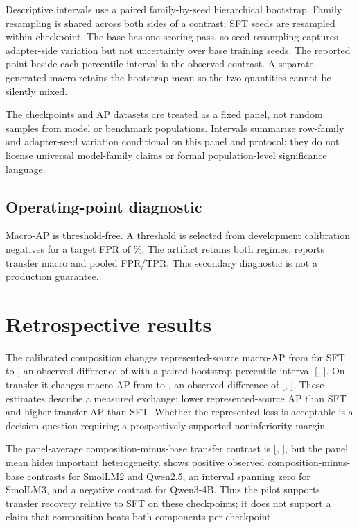 \documentclass[11pt]{article}
\begin{document}
Descriptive intervals use a paired family-by-seed hierarchical bootstrap.  Family resampling is
shared across both sides of a contrast; SFT seeds are resampled within checkpoint.  The base has
one scoring pass, so seed resampling captures adapter-side variation but not uncertainty over base
training seeds.  The reported point beside each percentile interval is the observed contrast.  A
separate generated macro retains the bootstrap mean so the two quantities cannot be silently
mixed.

The \PilotNModels{} checkpoints and \PilotNAPDatasets{} AP datasets are treated as a fixed panel, not random samples from
model or benchmark populations.  Intervals summarize row-family and adapter-seed variation
conditional on this panel and protocol; they do not license universal model-family claims or
formal population-level significance language.

\subsection{Operating-point diagnostic}

Macro-AP is threshold-free.  A threshold is selected from development calibration negatives for a
target FPR of \PilotTargetFPRPct\%.  The artifact retains both regimes; 
reports transfer macro and pooled FPR/TPR.  This secondary diagnostic is not a production guarantee.

\section{Retrospective results}
\label{sec:results}



The calibrated composition changes represented-source macro-AP from
\PilotSFTRepresented{} for SFT to \PilotCompositionRepresented{}, an observed difference of
\PilotRepDeltaSFT{} with a paired-bootstrap percentile interval
[\PilotRepDeltaSFTLow, \PilotRepDeltaSFTHigh].  On transfer it changes macro-AP from
\PilotSFTTransfer{} to \PilotCompositionTransfer{}, an observed difference of
\PilotTransferDeltaSFT{} [\PilotTransferDeltaSFTLow, \PilotTransferDeltaSFTHigh].  These estimates
describe a measured exchange: lower represented-source AP than SFT and higher transfer AP than
SFT.  Whether the represented loss is acceptable is a decision question requiring a prospectively
supported noninferiority margin.

The panel-average composition-minus-base transfer contrast is \PilotTransferDeltaBase{}
[\PilotTransferDeltaBaseLow, \PilotTransferDeltaBaseHigh], but the panel mean hides important
heterogeneity.   shows \PilotNTransferPositiveVsBase{} positive observed composition-minus-base contrasts
for SmolLM2 and Qwen2.5, an interval spanning zero for SmolLM3, and a negative contrast for
Qwen3-4B.  Thus the pilot supports transfer recovery relative to SFT on these checkpoints; it does
not support a claim that composition beats both components per checkpoint.
\end{document}
